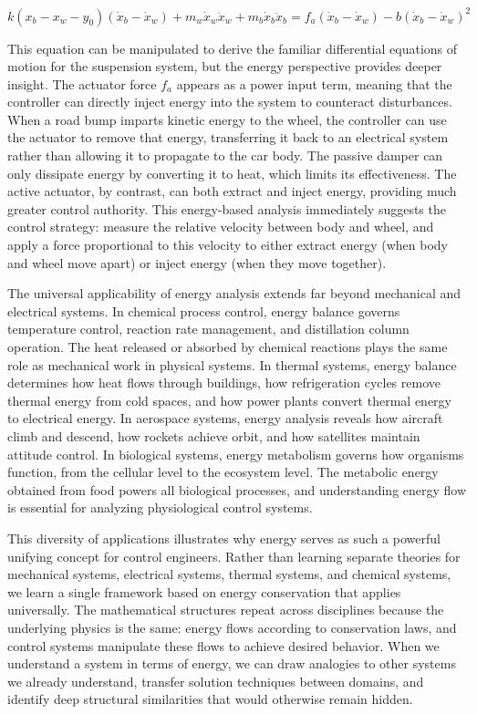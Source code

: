 $$k(x_b - x_w - y_0)(\dot{x}_b - \dot{x}_w) + m_w\dot{x}_w\ddot{x}_w + m_b\dot{x}_b\ddot{x}_b = f_a(\dot{x}_b - \dot{x}_w) - b(\dot{x}_b - \dot{x}_w)^2$$

This equation can be manipulated to derive the familiar differential equations of motion for the suspension system, but the energy perspective provides deeper insight. The actuator force $f_a$ appears as a power input term, meaning that the controller can directly inject energy into the system to counteract disturbances. When a road bump imparts kinetic energy to the wheel, the controller can use the actuator to remove that energy, transferring it back to an electrical system rather than allowing it to propagate to the car body. The passive damper can only dissipate energy by converting it to heat, which limits its effectiveness. The active actuator, by contrast, can both extract and inject energy, providing much greater control authority. This energy-based analysis immediately suggests the control strategy: measure the relative velocity between body and wheel, and apply a force proportional to this velocity to either extract energy (when body and wheel move apart) or inject energy (when they move together).

The universal applicability of energy analysis extends far beyond mechanical and electrical systems. In chemical process control, energy balance governs temperature control, reaction rate management, and distillation column operation. The heat released or absorbed by chemical reactions plays the same role as mechanical work in physical systems. In thermal systems, energy balance determines how heat flows through buildings, how refrigeration cycles remove thermal energy from cold spaces, and how power plants convert thermal energy to electrical energy. In aerospace systems, energy analysis reveals how aircraft climb and descend, how rockets achieve orbit, and how satellites maintain attitude control. In biological systems, energy metabolism governs how organisms function, from the cellular level to the ecosystem level. The metabolic energy obtained from food powers all biological processes, and understanding energy flow is essential for analyzing physiological control systems.

This diversity of applications illustrates why energy serves as such a powerful unifying concept for control engineers. Rather than learning separate theories for mechanical systems, electrical systems, thermal systems, and chemical systems, we learn a single framework based on energy conservation that applies universally. The mathematical structures repeat across disciplines because the underlying physics is the same: energy flows according to conservation laws, and control systems manipulate these flows to achieve desired behavior. When we understand a system in terms of energy, we can draw analogies to other systems we already understand, transfer solution techniques between domains, and identify deep structural similarities that would otherwise remain hidden.

